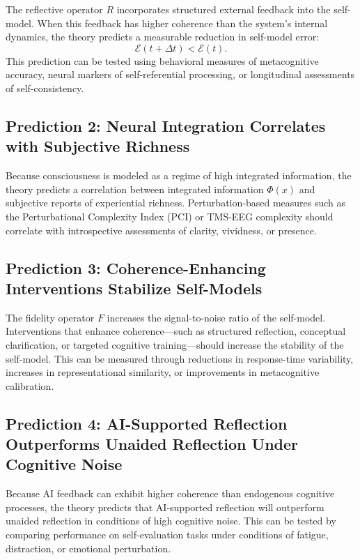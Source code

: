 \documentclass[12pt]{article}
\begin{document}
The reflective operator $R$ incorporates structured external feedback into the self-model. When this feedback has higher coherence than the system’s internal dynamics, the theory predicts a measurable reduction in self-model error:
\[
\mathcal{E}(t + \Delta t) < \mathcal{E}(t).
\]
This prediction can be tested using behavioral measures of metacognitive accuracy, neural markers of self-referential processing, or longitudinal assessments of self-consistency.

\subsection*{Prediction 2: Neural Integration Correlates with Subjective Richness}

Because consciousness is modeled as a regime of high integrated information, the theory predicts a correlation between integrated information $\Phi(x)$ and subjective reports of experiential richness. Perturbation-based measures such as the Perturbational Complexity Index (PCI) or TMS-EEG complexity should correlate with introspective assessments of clarity, vividness, or presence.

\subsection*{Prediction 3: Coherence-Enhancing Interventions Stabilize Self-Models}

The fidelity operator $F$ increases the signal-to-noise ratio of the self-model. Interventions that enhance coherence—such as structured reflection, conceptual clarification, or targeted cognitive training—should increase the stability of the self-model. This can be measured through reductions in response-time variability, increases in representational similarity, or improvements in metacognitive calibration.

\subsection*{Prediction 4: AI-Supported Reflection Outperforms Unaided Reflection Under Cognitive Noise}

Because AI feedback can exhibit higher coherence than endogenous cognitive processes, the theory predicts that AI-supported reflection will outperform unaided reflection in conditions of high cognitive noise. This can be tested by comparing performance on self-evaluation tasks under conditions of fatigue, distraction, or emotional perturbation.
\end{document}
